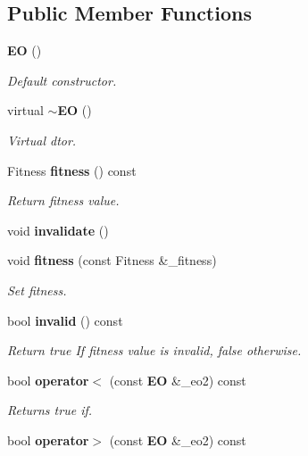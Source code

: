 \subsection*{Public Member Functions}
\begin{CompactItemize}
\item 
{\bf EO} ()
\begin{CompactList}\small\item\em Default constructor. \item\end{CompactList}\item 
virtual {\bf $\sim$EO} ()\label{class_e_o_a1}

\begin{CompactList}\small\item\em Virtual dtor. \item\end{CompactList}\item 
Fitness {\bf fitness} () const \label{class_e_o_a2}

\begin{CompactList}\small\item\em Return fitness value. \item\end{CompactList}\item 
void {\bf invalidate} ()\label{class_e_o_a3}

\item 
void {\bf fitness} (const Fitness \&\_\-fitness)
\begin{CompactList}\small\item\em Set fitness. \item\end{CompactList}\item 
bool {\bf invalid} () const 
\begin{CompactList}\small\item\em Return true If fitness value is invalid, false otherwise. \item\end{CompactList}\item 
bool {\bf operator$<$} (const {\bf EO} \&\_\-eo2) const 
\begin{CompactList}\small\item\em Returns true if. \item\end{CompactList}\item 
bool {\bf operator$>$} (const {\bf EO} \&\_\-eo2) const \label{class_e_o_a7}


\end{CompactItemize}
